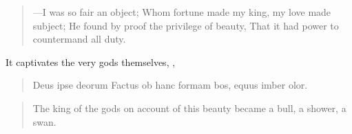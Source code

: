 \begin{verse}%
---I was so fair an object;
Whom fortune made my king, my love made subject;
He found by proof the privilege of beauty,
That it had power to countermand all duty.
\end{verse}%

It captivates the very gods themselves, ,

\begin{latin}
\begin{verse}%
Deus ipse deorum
Factus ob hanc formam bos, equus imber olor.
\end{verse}%
\end{latin}
\translationrule%
\begin{verse}%
The king of the gods
on account of this beauty became a bull, a shower, a swan.
\end{verse}%


